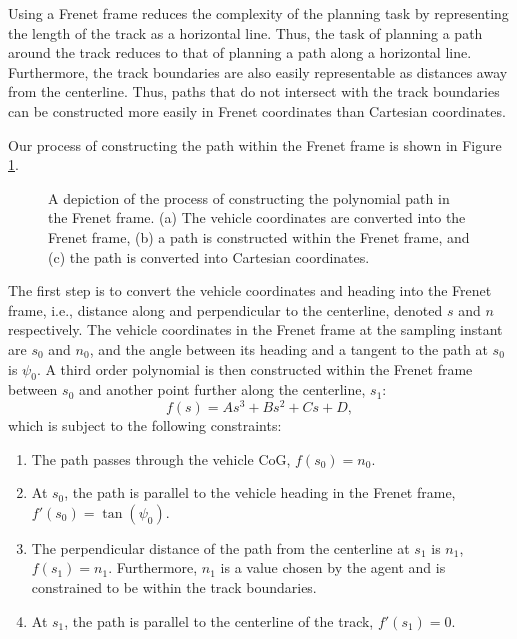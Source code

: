 Using a Frenet frame reduces the complexity of the planning task by representing the length of the track as a horizontal line.
Thus, the task of planning a path around the track reduces to that of planning a path along a horizontal line.
Furthermore, the track boundaries are also easily representable as distances away from the centerline.
Thus, paths that do not intersect with the track boundaries can be constructed more easily in Frenet coordinates than Cartesian coordinates.

Our process of constructing the path within the Frenet frame is shown in Figure \ref{fig:polynomial_path_generation}. 
\begin{figure}[htb!]
    \centering
    
    \caption[Constructing the polynomial path in the Frenet frame]{A depiction of the process of constructing the polynomial path in the Frenet frame. (a) The vehicle coordinates are converted into the Frenet frame, (b) a path is constructed within the Frenet frame, and (c) the path is converted into Cartesian coordinates.}
    \label{fig:polynomial_path_generation}
\end{figure}
The first step is to convert the vehicle coordinates and heading into the Frenet frame, i.e., distance along and perpendicular to the centerline, denoted $s$ and $n$ respectively. 
The vehicle coordinates in the Frenet frame at the sampling instant are $s_0$ and $n_0$, and the angle between its heading and a tangent to the path at $s_0$ is $\psi_0$. 
A third order polynomial is then constructed within the Frenet frame between $s_0$ and another point further along the centerline, $s_1$:
\begin{equation}
    f(s) = As^3 + Bs^2 + Cs + D,
\end{equation}
which is subject to the following constraints:
\begin{enumerate}
    \item The path passes through the vehicle CoG, $f(s_0)=n_0$.
    \item At $s_0$, the path is parallel to the vehicle heading in the Frenet frame, $f'(s_0)=\tan(\psi_0)$.
     \item The perpendicular distance of the path from the centerline at $s_1$ is $n_1$, $f(s_1)=n_1$. Furthermore, $n_1$ is a value chosen by the agent and is constrained to be within the track boundaries.
    \item At $s_1$, the path is parallel to the centerline of the track, $f'(s_1)=0$.
\end{enumerate}

